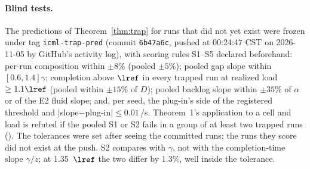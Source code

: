 \paragraph{Blind tests.} The predictions of Theorem~\ref{thm:trap} for runs that did not yet exist were frozen under tag
\texttt{icml-trap-pred} (commit \texttt{6b47a6c}, pushed at 00:24:47 CST on 2026-11-05 by GitHub's activity log), with scoring rules
S1--S5 declared beforehand: per-run composition within $\pm8$\% (pooled $\pm5$\%); pooled gap slope within $[0.6,1.4]\gamma$; completion
above $\lref$ in every trapped run at realized load $\ge1.1\lref$ (pooled within $\pm15$\% of $D$); pooled backlog slope within $\pm35$\%
of $\alpha$ or of the E2 fluid slope; and, per seed, the plug-in's side of the registered threshold and
$|$slope$-$plug-in$|\le0.01$\,/s. Theorem~1's application to a cell and load is refuted if the pooled S1 or S2 fails in a group of at
least two trapped runs (). The tolerances were set after seeing the committed runs; the runs
they score did not exist at the push. S2 compares with $\gamma$, not with the completion-time slope $\gamma/z$; at 1.35~$\lref$ the
two differ by 1.3\%, well inside the tolerance.

